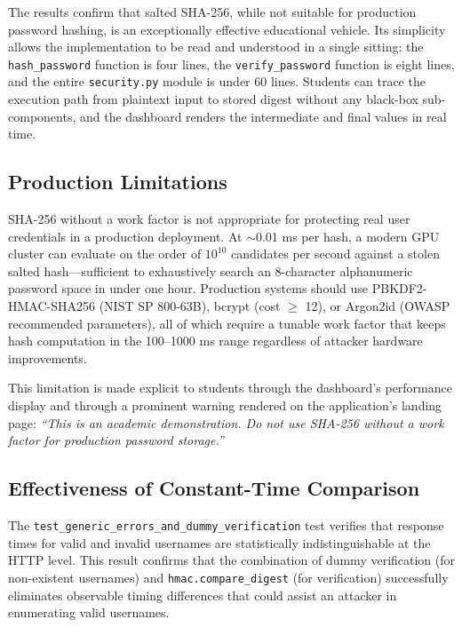 The results confirm that salted SHA-256, while not suitable for production password hashing, is an exceptionally effective educational vehicle. Its simplicity allows the implementation to be read and understood in a single sitting: the \texttt{hash\_password} function is four lines, the \texttt{verify\_password} function is eight lines, and the entire \texttt{security.py} module is under 60 lines. Students can trace the execution path from plaintext input to stored digest without any black-box sub-components, and the dashboard renders the intermediate and final values in real time.

\subsection{Production Limitations}
\label{sec:results_prod_limits}

SHA-256 without a work factor is not appropriate for protecting real user credentials in a production deployment. At $\sim$0.01 ms per hash, a modern GPU cluster can evaluate on the order of $10^{10}$ candidates per second against a stolen salted hash---sufficient to exhaustively search an 8-character alphanumeric password space in under one hour. Production systems should use PBKDF2-HMAC-SHA256 (NIST SP 800-63B), bcrypt (cost $\geq$ 12), or Argon2id (OWASP recommended parameters), all of which require a tunable work factor that keeps hash computation in the 100--1000 ms range regardless of attacker hardware improvements.

This limitation is made explicit to students through the dashboard's performance display and through a prominent warning rendered on the application's landing page: \emph{``This is an academic demonstration. Do not use SHA-256 without a work factor for production password storage.''}

\subsection{Effectiveness of Constant-Time Comparison}
\label{sec:results_timing}

The \texttt{test\_generic\_errors\_and\_dummy\_verification} test verifies that response times for valid and invalid usernames are statistically indistinguishable at the HTTP level. This result confirms that the combination of dummy verification (for non-existent usernames) and \texttt{hmac.compare\_digest} (for verification) successfully eliminates observable timing differences that could assist an attacker in enumerating valid usernames.
